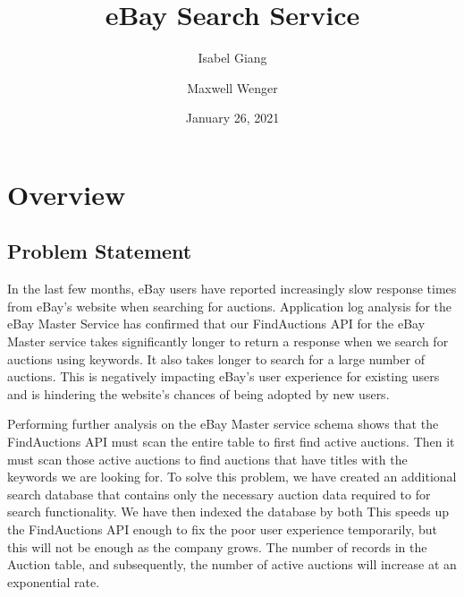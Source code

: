 \documentclass[12pt,a4paper]{article}
\title{eBay Search Service}
\author{Isabel Giang}
\author{Maxwell Wenger}
\affil{CSS490 Group Y4}
\date{January 26, 2021}
\begin{document}
\maketitle
\setcounter{tocdepth}{2}
\tableofcontents



\section{Overview}
\subsection{Problem Statement}
In the last few months, eBay users have reported increasingly slow response
times from eBay's website when searching for auctions. Application log analysis
for the eBay Master Service has confirmed that our FindAuctions API for the
eBay Master service takes significantly longer to return a response when we
search for auctions using keywords. It also takes longer to search for a large
number of auctions.
\vspace{\baselineskip}
This is negatively impacting eBay's user experience for existing users and is
hindering the website's chances of being adopted by new users.

\vspace{\baselineskip}

Performing further analysis on the eBay Master service schema shows that the
FindAuctions API must scan the entire table to first find active auctions. Then
it must scan those active auctions to find auctions that have titles with the
keywords we are looking for.
\vspace{\baselineskip}
To solve this problem, we have created an additional search database that
contains only the necessary auction data required to for search functionality.
We have then indexed the database by both 
\vspace{\baselineskip}
This speeds up the FindAuctions API enough to fix the poor user experience
temporarily, but this will not be enough as the company grows. The number of
records in the Auction table, and subsequently, the number of active auctions
will increase at an exponential rate.
\end{document}
